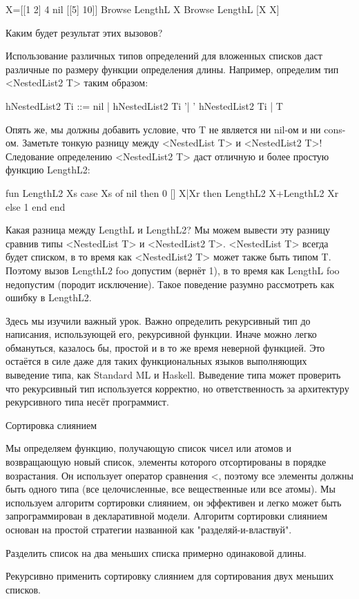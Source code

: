 X=[[1 2] 4 nil [[5] 10]]
{Browse {LengthL X}}
{Browse {LengthL [X X]}}

Каким будет результат этих вызовов?

Использование различных типов определений для вложенных списков даст различные по размеру функции определения длины. Например, определим тип <NestedList2 T> таким образом:

hNestedList2 Ti
::= nil
| hNestedList2 Ti '| ' hNestedList2 Ti
| T

Опять же, мы должны добавить условие, что T не является ни nil-ом и ни cons-ом. Заметьте тонкую разницу между <NestedList T> и <NestedList2 T>! Следование определению <NestedList2 T> даст отличную и более простую функцию LengthL2:

fun {LengthL2 Xs}
case Xs
of nil then 0
[] X|Xr then
{LengthL2 X}+{LengthL2 Xr}
else 1 end
end

Какая разница между LengthL и LengthL2? Мы можем вывести эту разницу сравнив типы <NestedList T> и <NestedList2 T>. <NestedList T> всегда будет списком, в то время как <NestedList2 T> может также быть типом T. Поэтому вызов {LengthL2 foo} допустим (вернёт 1), в то время как {LengthL foo} недопустим (породит исключение). Такое поведение разумно рассмотреть как ошибку в LengthL2.

Здесь мы изучили важный урок. Важно определить рекурсивный тип до написания, использующей его, рекурсивной функции. Иначе можно легко обмануться, казалось бы, простой и в то же время неверной функцией. Это остаётся в силе даже для таких функциональных языков выполняющих выведение типа, как Standard ML и Haskell. Выведение типа может проверить что рекурсивный тип используется корректно, но ответственность за архитектуру рекурсивного типа несёт программист.

Сортировка слиянием

Мы определяем функцию, получающую список чисел или атомов и возвращающую новый список, элементы которого отсортированы в порядке возрастания. Он использует оператор сравнения <, поэтому все элементы должны быть одного типа (все целочисленные, все вещественные или все атомы). Мы используем алгоритм сортировки слиянием, он эффективен и легко может быть запрограммирован в декларативной модели. Алгоритм сортировки слиянием основан на простой стратегии названной как "разделяй-и-властвуй".

Разделить список на два меньших списка примерно одинаковой длины.

Рекурсивно применить сортировку слиянием для сортирования двух меньших списков.

